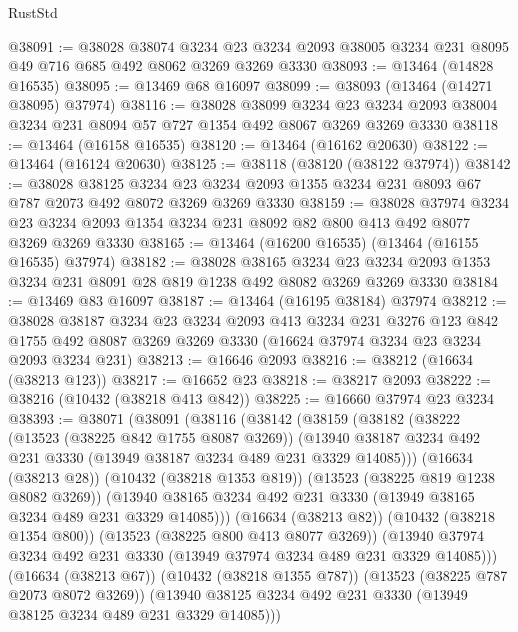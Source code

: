 \begin{lexlean}{RustStd}
\begin{coremodule}
@38091 := @38028
    @38074
    @3234
    @23
    @3234
    @2093
    @38005
    @3234
    @231
    @8095
    @49
    @716
    @685
    @492
    @8062
    @3269
    @3269
    @3330
@38093 := @13464 (@14828 @16535)
@38095 := @13469 @68 @16097
@38099 := @38093 (@13464 (@14271 @38095) @37974)
@38116 := @38028
    @38099
    @3234
    @23
    @3234
    @2093
    @38004
    @3234
    @231
    @8094
    @57
    @727
    @1354
    @492
    @8067
    @3269
    @3269
    @3330
@38118 := @13464 (@16158 @16535)
@38120 := @13464 (@16162 @20630)
@38122 := @13464 (@16124 @20630)
@38125 := @38118 (@38120 (@38122 @37974))
@38142 := @38028
    @38125
    @3234
    @23
    @3234
    @2093
    @1355
    @3234
    @231
    @8093
    @67
    @787
    @2073
    @492
    @8072
    @3269
    @3269
    @3330
@38159 := @38028
    @37974
    @3234
    @23
    @3234
    @2093
    @1354
    @3234
    @231
    @8092
    @82
    @800
    @413
    @492
    @8077
    @3269
    @3269
    @3330
@38165 := @13464 (@16200 @16535) (@13464 (@16155 @16535) @37974)
@38182 := @38028
    @38165
    @3234
    @23
    @3234
    @2093
    @1353
    @3234
    @231
    @8091
    @28
    @819
    @1238
    @492
    @8082
    @3269
    @3269
    @3330
@38184 := @13469 @83 @16097
@38187 := @13464 (@16195 @38184) @37974
@38212 := @38028
    @38187
    @3234
    @23
    @3234
    @2093
    @413
    @3234
    @231
    @3276
    @123
    @842
    @1755
    @492
    @8087
    @3269
    @3269
    @3330
    (@16624 @37974 @3234 @23 @3234 @2093 @3234 @231)
@38213 := @16646 @2093
@38216 := @38212 (@16634 (@38213 @123))
@38217 := @16652 @23
@38218 := @38217 @2093
@38222 := @38216 (@10432 (@38218 @413 @842))
@38225 := @16660 @37974 @23 @3234
@38393 := @38071
    (@38091
      (@38116
        (@38142
          (@38159
            (@38182
              (@38222
                (@13523 (@38225 @842 @1755 @8087 @3269))
                (@13940 @38187 @3234 @492 @231 @3330 (@13949 @38187 @3234 @489 @231 @3329 @14085)))
              (@16634 (@38213 @28))
              (@10432 (@38218 @1353 @819))
              (@13523 (@38225 @819 @1238 @8082 @3269))
              (@13940 @38165 @3234 @492 @231 @3330 (@13949 @38165 @3234 @489 @231 @3329 @14085)))
            (@16634 (@38213 @82))
            (@10432 (@38218 @1354 @800))
            (@13523 (@38225 @800 @413 @8077 @3269))
            (@13940 @37974 @3234 @492 @231 @3330 (@13949 @37974 @3234 @489 @231 @3329 @14085)))
          (@16634 (@38213 @67))
          (@10432 (@38218 @1355 @787))
          (@13523 (@38225 @787 @2073 @8072 @3269))
          (@13940 @38125 @3234 @492 @231 @3330 (@13949 @38125 @3234 @489 @231 @3329 @14085)))

\end{coremodule}
\end{lexlean}
